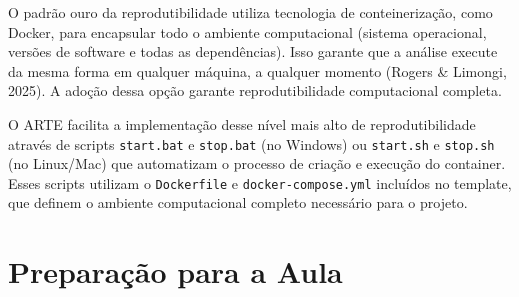\documentclass[
  a4paper,
]{book}
\begin{document}
O padrão ouro da reprodutibilidade utiliza tecnologia de
conteinerização, como Docker, para encapsular todo o ambiente
computacional (sistema operacional, versões de software e todas as
dependências). Isso garante que a análise execute da mesma forma em
qualquer máquina, a qualquer momento (Rogers \& Limongi, 2025). A adoção
dessa opção garante reprodutibilidade computacional completa.

O ARTE facilita a implementação desse nível mais alto de
reprodutibilidade através de scripts \texttt{start.bat} e
\texttt{stop.bat} (no Windows) ou \texttt{start.sh} e \texttt{stop.sh}
(no Linux/Mac) que automatizam o processo de criação e execução do
container. Esses scripts utilizam o \texttt{Dockerfile} e
\texttt{docker-compose.yml} incluídos no template, que definem o
ambiente computacional completo necessário para o projeto.

\section{Preparação para a Aula}\label{preparauxe7uxe3o-para-a-aula-6}
\end{document}
